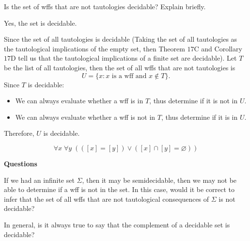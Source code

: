 \documentclass[english, 11pt]{amsart}
\begin{document}
\setlength{\headheight}{13.0pt}
\setlength{\footskip}{15.0pt}


  \begin{problem}
    Is the set of wffs that are not tautologies decidable?
    Explain briefly.
  \end{problem}
  \begin{Answer}
    Yes, the set is decidable.
    
    \step
    Since the set of all tautologies is decidable
    (Taking the set of all tautologies
    as the tautological implications of the empty set,
    then Theorem $17$C and Corollary $17$D tell us that
    the tautological implications of a finite set are decidable).
    Let $T$ be the list of all tautologies, then
    the set of all wffs that are not tautologies is
    \[
      U = \{ x : x \text{ is a wff and } x \notin T \}.  
    \]
    Since $T$ is decidable:
    \begin{itemize}
      \item We can always evaluate whether a wff is in $T$,
        thus determine if it is not in $U$.
      \item We can always evaluate whether a wff is not in $T$,
        thus determine if it is in $U$.
    \end{itemize}
    Therefore, $U$ is decidable.

    \[ \forall x\; \forall y\; (([x] = [y]) \lor ([x] \cap [y] = \varnothing))\]

  \end{Answer}
    \step
    \begin{blockcolor}
      \begin{center}\textbf{Questions} \end{center}

      \step
      If we had an infinite set $\Sigma$,
      then it may be semidecidable, then we may not
      be able to determine if a wff is not in the set.
      In this case, would it be correct to infer that the set of all wffs
      that are not tautological consequences of $\Sigma$
      is not decidable?

      \step
      In general, is it always true to say that the complement of a
      decidable set is decidable?
    \end{blockcolor}
\bigskip
\end{document}
